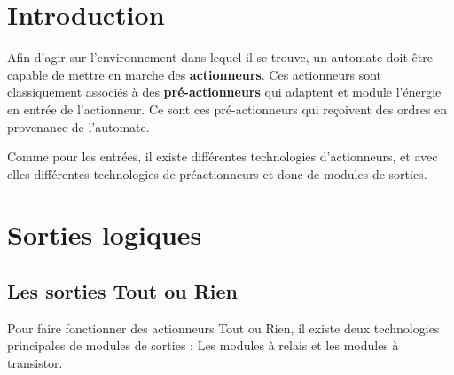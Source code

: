 \documentclass[11pt]{article}
\begin{document}
\UPSTIbuildPage


\tableofcontents
\pagebreak


\section{Introduction}
Afin d'agir sur l'environnement dans lequel il se trouve, un automate doit être capable de mettre en marche des \textbf{actionneurs}. Ces actionneurs sont classiquement associés à des \textbf{pré-actionneurs} qui adaptent et module l'énergie en entrée de l'actionneur. Ce sont ces pré-actionneurs qui reçoivent des ordres en provenance de l'automate.


Comme pour les entrées, il existe différentes technologies d'actionneurs, et avec elles différentes technologies de préactionneurs et donc de modules de sorties.

\section{Sorties logiques}



\subsection{Les sorties Tout ou Rien}
Pour faire fonctionner des actionneurs Tout ou Rien, il existe deux technologies principales de modules de sorties : Les modules à relais et les modules à transistor.
\end{document}
